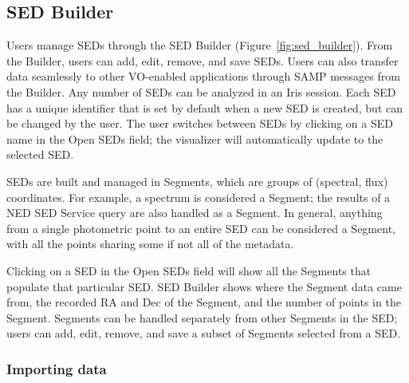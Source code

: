 \documentclass[preprint,authoryear,5p]{elsarticle}
\begin{document}
\subsection{SED Builder}

Users manage SEDs through the SED Builder (Figure~\ref{fig:sed_builder}). From
the Builder, users can add, edit, remove, and save SEDs. Users can also transfer
data seamlessly to other VO-enabled applications through SAMP messages from the
Builder. Any number of SEDs can be analyzed in an Iris session. Each SED has a
unique identifier that is set by default when a new SED is created, but can be
changed by the user. The user switches between SEDs by clicking on a SED name in
the Open SEDs field; the visualizer will automatically update to the selected
SED.

SEDs are built and managed in Segments, which are groups of (spectral, flux)
coordinates. For example, a spectrum is considered a Segment; the results of a
NED SED Service query are also handled as a Segment. In general, anything from a
single photometric point to an entire SED can be considered a Segment, with all the
points sharing some if not all of the metadata.

Clicking on a SED in the Open SEDs field will show all the Segments that
populate that particular SED. SED Builder shows where the Segment data came
from, the recorded RA and Dec of the Segment, and the number of points in the
Segment. Segments can be handled separately from other Segments in the SED;
users can add, edit, remove, and save a subset of Segments selected from a SED.

\subsubsection{Importing data}
\end{document}
